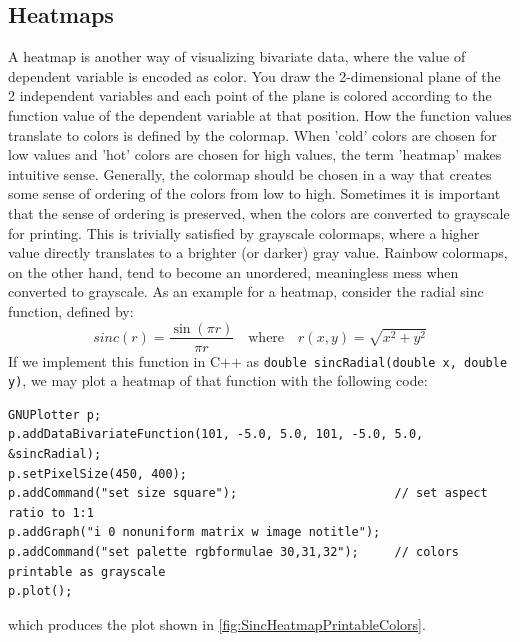 \documentclass[11pt]{article}
\begin{document}
\subsection{Heatmaps} 
A heatmap is another way of visualizing bivariate data, where the value of dependent variable is encoded as color. You draw the 2-dimensional plane of the 2 independent variables and each point of the plane is colored according to the function value of the dependent variable at that position. How the function values translate to colors is defined by the colormap. When 'cold' colors are chosen for low values and 'hot' colors are chosen for high values, the term 'heatmap' makes intuitive sense. Generally, the colormap should be chosen in a way that creates some sense of ordering of the colors from low to high. Sometimes it is important that the sense of ordering is preserved, when the colors are converted to grayscale for printing. This is trivially satisfied by grayscale colormaps, where a higher value directly translates to a brighter (or darker) gray value. Rainbow colormaps, on the other hand, tend to become an unordered, meaningless mess when converted to grayscale. As an example for a heatmap, consider the radial sinc function, defined by:
\begin{equation}
 sinc(r) = \frac{\sin(\pi r)}{\pi r} \quad \text{where} \quad r(x,y) = \sqrt{x^2+y^2}
\end{equation}
If we implement this function in C++ as \texttt{double sincRadial(double x, double y)}, we may plot a heatmap of that function with the following code:
\begin{verbatim}
GNUPlotter p;
p.addDataBivariateFunction(101, -5.0, 5.0, 101, -5.0, 5.0, &sincRadial);
p.setPixelSize(450, 400);
p.addCommand("set size square");                      // set aspect ratio to 1:1
p.addGraph("i 0 nonuniform matrix w image notitle");  
p.addCommand("set palette rgbformulae 30,31,32");     // colors printable as grayscale
p.plot();
\end{verbatim}
which produces the plot shown in \ref{fig:SincHeatmapPrintableColors}.
\end{document}
